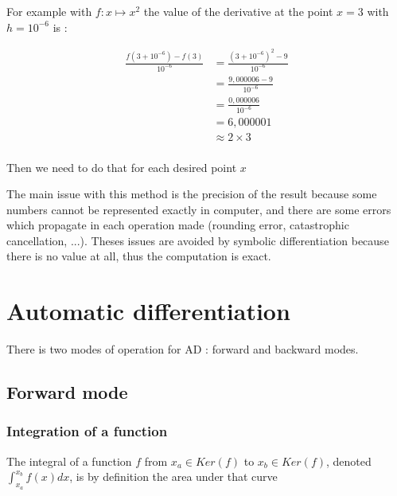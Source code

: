 \documentclass[12pt]{article}
\begin{document}
For example with $f: x \mapsto x^2$ the value of the derivative at the point $x=3$ with $h=10^{-6}$ is :

\begin{equation*}
    \begin{split}
        \frac{f(3+10^{-6})-f(3)}{10^{-6}} &= \frac{(3+10^{-6})^2 - 9}{10^{-6}}\\
            &= \frac{9,000006 - 9}{10^{-6}}\\
            &= \frac{0,000006}{10^{-6}}\\
            &= 6,000001 \\
            &\approx 2 \times 3 \\
    \end{split}
\end{equation*}

Then we need to do that for each desired point $x$

The main issue with this method is the precision of the result because some numbers cannot \cite{stackexchange_how_many_numbers_in_computer} be represented exactly in computer, and there are some errors \cite{web_floatin_point_errors} which propagate in each operation made (rounding error, catastrophic cancellation, ...).
Theses issues are avoided by symbolic differentiation because there is no value at all, thus the computation is exact.


%
%

\section{Automatic differentiation}

There is two modes of operation for AD : forward and backward modes.

\subsection{Forward mode}

\subsubsection{Integration of a function}

The integral of a function $f$ from $x_a \in Ker(f)$ to $x_b \in Ker(f)$, denoted $\int_{x_a}^{x_b} f(x)dx$, is by definition the area under that curve 
\end{document}

